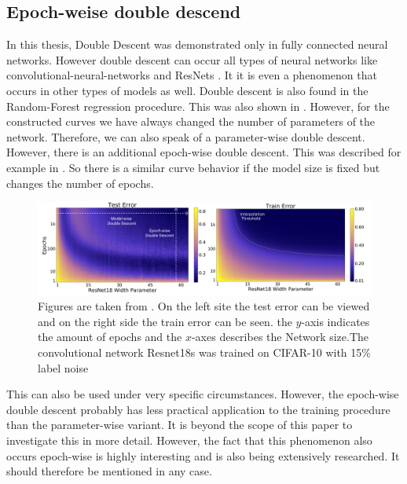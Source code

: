 \subsection{Epoch-weise double descend}
In this thesis, Double Descent was demonstrated only in fully connected neural networks. However double descent can occur all types of neural networks like convolutional-neural-networks and ResNets \cite{Nakkiran_2021_more_data_hurt}. It it is even a phenomenon that occurs in other types of models as well. Double descent is also found in the Random-Forest regression procedure. This was also shown in \cite{belkin}.
However, for the constructed curves we have always changed the number of parameters of the network. Therefore, we can also speak of a parameter-wise double descent. However, there is an additional epoch-wise double descent. This was described for example in \cite{Nakkiran_2021_more_data_hurt}. So there is a similar curve behavior if the model size is fixed but changes the number of epochs. 

\begin{figure}[!htp]
\centering
\includegraphics[width= 1\linewidth]{Abschlussarbeit_2021/LaTeX/images/Epochwise.PNG}
\caption{ Figures are taken from \cite{Nakkiran_2021_more_data_hurt}. On the left site the test error can be viewed and on the right side the train error can be seen. the $y$-axis indicates the amount of epochs and the $x$-axes describes the Network size.The convolutional network Resnet18s was trained on CIFAR-10 with 15\% label noise }
\label{fig: epochwise double descent}
\end{figure}

This can also be used under very specific circumstances. However, the epoch-wise double descent probably has less practical application to the training procedure than the parameter-wise variant. It is beyond the scope of this paper to investigate this in more detail. However, the fact that this phenomenon also occurs epoch-wise is highly interesting and is also being extensively researched. It should therefore be mentioned in any case. 







 

\newpage

